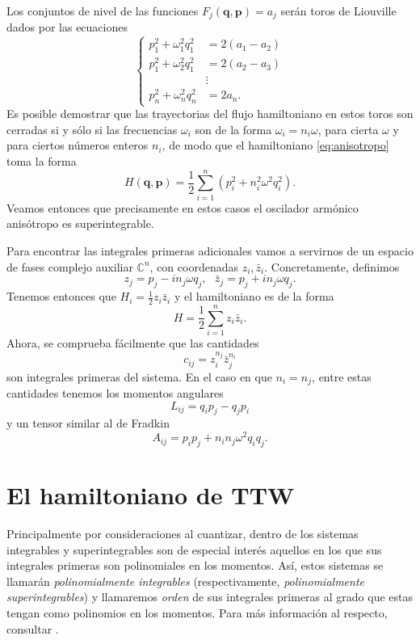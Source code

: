\documentclass[12pt,a4paper,twoside]{article}
\theoremstyle{definition} \newtheorem{defn}[thm]{Definición}
\theoremstyle{definition} \newtheorem{ejemplo}[thm]{Ejemplo}
\theoremstyle{definition} \newtheorem{ejercicio}[thm]{Ejercicio}
\theoremstyle{remark} \newtheorem*{obs}{Observación}
\def\CC{\mathbb{C}}
\newcommand{\vect}[1]{\mathbf{#1}}
\begin{document}
Los conjuntos de nivel de las funciones $F_j(\vect{q},\vect{p})=a_j$ serán toros de Liouville dados por las ecuaciones
\begin{equation*}
  \begin{cases}
    p_1^2+\omega_1^2q_1^2&= 2(a_1-a_2)\\
    p_1^2+\omega_2^2q_1^2&= 2(a_2-a_3)\\
     &\vdots \\
    p_n^2+\omega_n^2q_n^2&= 2a_n.
  \end{cases}
\end{equation*}
Es posible demostrar que las trayectorias del flujo hamiltoniano en estos toros son cerradas si y sólo si las frecuencias $\omega_i$ son de la forma $\omega_i=n_i \omega$, para cierta $\omega$ y para ciertos números enteros $n_i$, de modo que el hamiltoniano \eqref{eq:anisotropo} toma la forma
\begin{equation}
  H(\vect{q},\vect{p})=\frac{1}{2}\sum_{i=1}^n \left(p_i^2 + n_i^2\omega^2q_i^2\right).
\end{equation}
Veamos entonces que precisamente en estos casos el oscilador armónico anisótropo es superintegrable.

Para encontrar las integrales primeras adicionales vamos a servirnos de un espacio de fases complejo auxiliar $\CC^n$, con coordenadas $z_i, \bar{z}_i$. Concretamente, definimos
\begin{equation}
  z_j=p_j-in_j\omega q_j,\ \ \  \bar{z}_j=p_j+in_j\omega q_j.  
\end{equation}
Tenemos entonces que $H_i=\frac{1}{2}z_i\bar{z}_i$ y el hamiltoniano es de la forma
\begin{equation}
  H=\frac{1}{2}\sum_{i=1}^n z_i\bar{z}_i. 
\end{equation}
Ahora, se comprueba fácilmente que las cantidades
\begin{equation}
  c_{ij}=z_i^{n_j}\bar{z}_j^{n_i} 
\end{equation}
son integrales primeras del sistema. En el caso en que $n_i=n_j$, entre estas cantidades tenemos los momentos angulares
\begin{equation}
  L_{ij}=q_ip_j-q_jp_i 
\end{equation}
y un tensor similar al de Fradkin
\begin{equation}
  A_{ij}=p_ip_j+n_in_j\omega^2 q_iq_j. 
\end{equation}

\section{El hamiltoniano de TTW}
Principalmente por consideraciones al cuantizar, dentro de los sistemas integrables y superintegrables son de especial interés aquellos en los que sus integrales primeras son polinomiales en los momentos. Así, estos sistemas se llamarán \emph{polinomialmente integrables} (respectivamente, \emph{polinomialmente superintegrables}) y llamaremos \emph{orden} de sus integrales primeras al grado que estas tengan como polinomios en los momentos. Para más información al respecto, consultar \cite{miller}.
\end{document}
